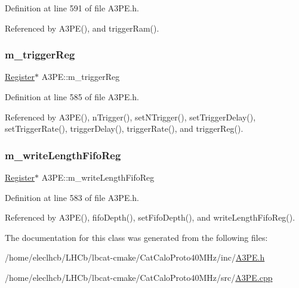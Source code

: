 Definition at line 591 of file A3\+P\+E.\+h.



Referenced by A3\+P\+E(), and trigger\+Ram().

\mbox{\label{classA3PE_a750158ae488121ab7969452f061e678c}} 
\subsubsection{\texorpdfstring{m\+\_\+trigger\+Reg}{m\_triggerReg}}
{\footnotesize\ttfamily \hyperlink{classRegister}{Register}$\ast$ A3\+P\+E\+::m\+\_\+trigger\+Reg\hspace{0.3cm}{\ttfamily [private]}}



Definition at line 585 of file A3\+P\+E.\+h.



Referenced by A3\+P\+E(), n\+Trigger(), set\+N\+Trigger(), set\+Trigger\+Delay(), set\+Trigger\+Rate(), trigger\+Delay(), trigger\+Rate(), and trigger\+Reg().

\mbox{\label{classA3PE_a9a0cb2253ea34c0be567a03684217fee}} 
\subsubsection{\texorpdfstring{m\+\_\+write\+Length\+Fifo\+Reg}{m\_writeLengthFifoReg}}
{\footnotesize\ttfamily \hyperlink{classRegister}{Register}$\ast$ A3\+P\+E\+::m\+\_\+write\+Length\+Fifo\+Reg\hspace{0.3cm}{\ttfamily [private]}}



Definition at line 583 of file A3\+P\+E.\+h.



Referenced by A3\+P\+E(), fifo\+Depth(), set\+Fifo\+Depth(), and write\+Length\+Fifo\+Reg().



The documentation for this class was generated from the following files\+:\begin{DoxyCompactItemize}
\item 
/home/eleclhcb/\+L\+H\+Cb/lbcat-\/cmake/\+Cat\+Calo\+Proto40\+M\+Hz/inc/\hyperlink{A3PE_8h}{A3\+P\+E.\+h}\item 
/home/eleclhcb/\+L\+H\+Cb/lbcat-\/cmake/\+Cat\+Calo\+Proto40\+M\+Hz/src/\hyperlink{A3PE_8cpp}{A3\+P\+E.\+cpp}\end{DoxyCompactItemize}
